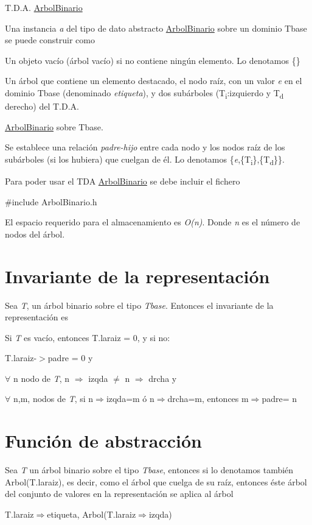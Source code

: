 T.\+D.\+A. \hyperlink{classArbolBinario}{Arbol\+Binario}

Una instancia {\itshape a} del tipo de dato abstracto \hyperlink{classArbolBinario}{Arbol\+Binario} sobre un dominio Tbase se puede construir como

Un objeto vacío (árbol vacío) si no contiene ningún elemento. Lo denotamos \{\}

Un árbol que contiene un elemento destacado, el nodo raíz, con un valor {\itshape e} en el dominio Tbase (denominado {\itshape etiqueta}), y dos subárboles (T\textsubscript{i}\+:izquierdo y T\textsubscript{d} derecho) del T.\+D.\+A.

\hyperlink{classArbolBinario}{Arbol\+Binario} sobre Tbase.

Se establece una relación {\itshape padre-\/hijo} entre cada nodo y los nodos raíz de los subárboles (si los hubiera) que cuelgan de él. Lo denotamos \{{\itshape e},\{T\textsubscript{i}\},\{T\textsubscript{d}\}\}.

Para poder usar el T\+DA \hyperlink{classArbolBinario}{Arbol\+Binario} se debe incluir el fichero

{\ttfamily \#include Arbol\+Binario.\+h}

El espacio requerido para el almacenamiento es {\itshape O(n)}. Donde {\itshape n} es el número de nodos del árbol.\hypertarget{repConjunto_invConjunto}{}\section{Invariante de la representación}\label{repConjunto_invConjunto}
Sea {\itshape T}, un árbol binario sobre el tipo {\itshape Tbase}. Entonces el invariante de la representación es

Si {\itshape T} es vacío, entonces T.\+laraiz = 0, y si no\+:

T.\+laraiz-\/$>$padre = 0 y

{$\forall$} n nodo de {\itshape T}, n {$\Rightarrow$}  izqda {$\ne$} n {$\Rightarrow$} drcha y

{$\forall$} n,m, nodos de {\itshape T}, si n{$\Rightarrow$}izqda=m ó n{$\Rightarrow$}drcha=m, entonces m{$\Rightarrow$}padre= n\hypertarget{repConjunto_faConjunto}{}\section{Función de abstracción}\label{repConjunto_faConjunto}
Sea {\itshape T} un árbol binario sobre el tipo {\itshape Tbase}, entonces si lo denotamos también Arbol(T.\+laraiz), es decir, como el árbol que cuelga de su raíz, entonces éste árbol del conjunto de valores en la representación se aplica al árbol

T.\+laraiz{$\Rightarrow$}etiqueta, Arbol(T.\+laraiz{$\Rightarrow$}izqda) 